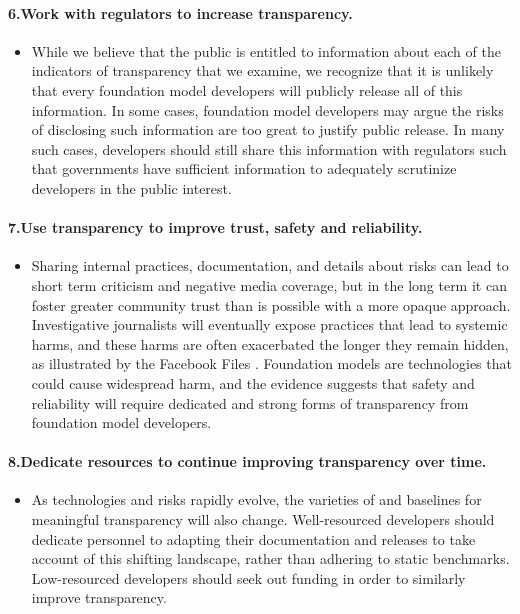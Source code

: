 \paragraph{6.\phantom{X}Work with regulators to increase transparency.} 
    \begin{itemize}
        \item While we believe that the public is entitled to information about each of the indicators of transparency that we examine, we recognize that it is unlikely that every foundation model developers will publicly release all of this information. 
        In some cases, foundation model developers may argue the risks of disclosing such information are too great to justify public release. 
        In many such cases, developers should still share this information with regulators such that governments have sufficient information to adequately scrutinize developers in the public interest.
    \end{itemize}
\paragraph{7.\phantom{X}Use transparency to improve trust, safety and reliability.} 
    \begin{itemize}
        \item Sharing internal practices, documentation, and details about risks can lead to short term criticism and negative media coverage, but in the long term it can foster greater community trust than is possible with a more opaque approach.
        Investigative journalists will eventually expose practices that lead to systemic harms, and these harms are often exacerbated the longer they remain hidden, as illustrated by the Facebook Files \cite{wsj2021fb}.
        Foundation models are technologies that could cause widespread harm, and the evidence suggests that safety and reliability will require dedicated and strong forms of transparency from foundation model developers.
    \end{itemize} \clearpage
\paragraph{8.\phantom{X}Dedicate resources to continue improving transparency over time.} 
    \begin{itemize}
        \item As technologies and risks rapidly evolve, the varieties of and baselines for meaningful transparency will also change.
        Well-resourced developers should dedicate personnel to adapting their documentation and releases to take account of this shifting landscape, rather than adhering to static benchmarks.
        Low-resourced developers should seek out funding in order to similarly improve transparency.
    \end{itemize}
